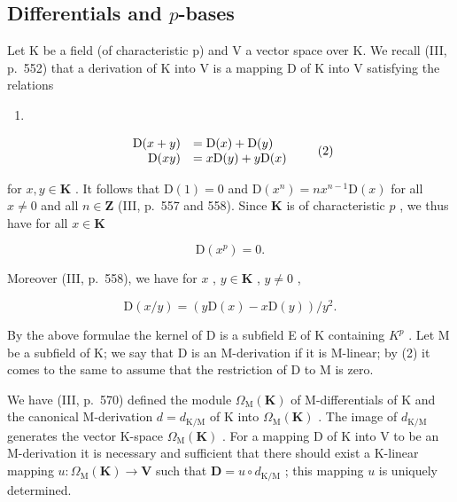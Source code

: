 \subsection{\texorpdfstring{Differentials and \(p\)-bases}{Differentials and p-bases}}

Let K be a field (of characteristic p) and V a vector space over K. We recall (III, p.~552) that a derivation of K into V is a mapping D of K into V satisfying the relations

\begin{enumerate}
\def\labelenumi{(\arabic{enumi})}
\tightlist
\item
\end{enumerate}

\[
\begin{array}{r l} \mathrm{D} (x + y) & = \mathrm{D} (x) + \mathrm{D} (y) \\ \mathrm{D} (x y) & = x \mathrm{D} (y) + y \mathrm{D} (x) \end{array}\tag{2}
\]

for \(x, y \in \mathbf{K}\) . It follows that \(\mathrm{D}(1) = 0\) and \(\mathrm{D}(x^n) = nx^{n-1}\mathrm{D}(x)\) for all \(x \neq 0\) and all \(n \in \mathbf{Z}\) (III, p.~557 and 558). Since \(\mathbf{K}\) is of characteristic \(p\) , we thus have for all \(x \in \mathbf{K}\)

\[
\mathrm{D} \left(x ^ {p}\right) = 0.\tag{3}
\]

Moreover (III, p.~558), we have for \(x\) , \(y \in \mathbf{K}\) , \(y \neq 0\) ,

\[
\mathrm{D} (x / y) = \left(y \mathrm{D} (x) - x \mathrm{D} (y)\right) / y ^ {2}.\tag{4}
\]

By the above formulae the kernel of D is a subfield E of K containing \(K^{p}\) . Let M be a subfield of K; we say that D is an M-derivation if it is M-linear; by (2) it comes to the same to assume that the restriction of D to M is zero.

We have (III, p.~570) defined the module \(\Omega_{\mathrm{M}}(\mathbf{K})\) of M-differentials of K and the canonical M-derivation \(d = d_{\mathrm{K / M}}\) of K into \(\Omega_{\mathrm{M}}(\mathbf{K})\) . The image of \(d_{\mathrm{K / M}}\) generates the vector K-space \(\Omega_{\mathrm{M}}(\mathbf{K})\) . For a mapping D of K into V to be an M-derivation it is necessary and sufficient that there should exist a K-linear mapping \(u: \Omega_{\mathrm{M}}(\mathbf{K}) \to \mathbf{V}\) such that \(\mathbf{D} = u \circ d_{\mathrm{K / M}}\) ; this mapping \(u\) is uniquely determined.

